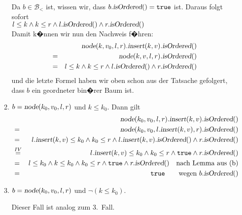 \documentclass{article}
\begin{document}
\begin{enumerate}
\begin{enumerate}
            Da $b\in \mathcal{B}_<$ ist, wissen wir, dass $b.\textsl{isOrdered}() = \mathtt{true}$
            ist.  Daraus folgt sofort
            \\[0.2cm]
            \hspace*{1.3cm}
            $l \leq k \wedge k \leq r \wedge l.\textsl{isOrdered}() \wedge r.\textsl{isOrdered}()$
            \\[0.2cm]
            Damit k�nnen wir nun den Nachweis f�hren:
            \begin{eqnarray*}
            &   & \textsl{node}(k,v_0,l,r).\textsl{insert}(k,v).\textsl{isOrdered}() \\
            & = & \textsl{node}(k,v,l,r).\textsl{isOrdered}() \\
            & = & l \leq k \wedge k \leq r \wedge l.\textsl{isOrdered}() \wedge r.\textsl{isOrdered}() 
            \end{eqnarray*}
            und die letzte Formel haben wir oben schon aus der Tatsache gefolgert,
            dass $b$ ein geordneter bin�rer Baum ist.
      \item $b = \textsl{node}(k_0,v_0,l,r)$ und $k \leq k_0$.  Dann gilt
            \begin{eqnarray*}
            &   & \textsl{node}(k_0,v_0,l,r).\textsl{insert}(k,v).\textsl{isOrdered}() \\
            & = & \textsl{node}(k_0,v_0,l.\textsl{insert}(k,v),r).\textsl{isOrdered}() \\
            & = & l.\textsl{insert}(k,v) \leq k_0 \wedge k_0 \leq r
                  \wedge l.\textsl{insert}(k,v).\textsl{isOrdered}() \wedge r.\textsl{isOrdered}() \\
            & \stackrel{IV}{=} & l.\textsl{insert}(k,v) \leq k_0 \wedge k_0 \leq r \wedge
                  \mathtt{true} \wedge r.\textsl{isOrdered}() \\
            & = & l \leq k_0 \wedge  k \leq k_0 \wedge k_0 \leq r \wedge
                  \mathtt{true} \wedge r.\textsl{isOrdered}() \quad\mbox{nach Lemma aus (b)}\\
            & = & \mathtt{true} \qquad\mbox{wegen $b.\textsl{isOrdered}()$}
            \end{eqnarray*}
      \item $b = \textsl{node}(k_0,v_0,l,r)$ und $\neg(k \leq k_0)$. 

            Dieser Fall ist analog zum 3.~Fall.
      \end{enumerate}
\end{enumerate}
\end{document}
